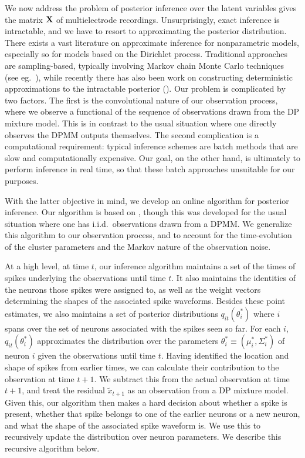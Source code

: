 \newcommand{\tx}{\tilde{x}}

We now address the problem of posterior inference over the latent variables gives the matrix $\mathbf{X}$ of multielectrode recordings. Unsurprisingly, exact 
inference is intractable, and we have to resort to approximating the posterior distribution.
There exists a vast literature on approximate inference for nonparametric models, especially so for models based on the Dirichlet process.
Traditional approaches are sampling-based, typically involving Markov chain Monte Carlo techniques (see eg.\ \citep{Nea2000, IshJam2001}), 
while recently there has also been work on constructing deterministic approximations to the intractable posterior (\citep{BleJor2006, MinGha2003}).
Our problem is complicated by two factors. The first is the convolutional nature of our observation process, where we observe a functional of the 
sequence of observations drawn from the DP mixture model. This is in contrast to the usual situation where one directly observes the DPMM outputs themselves.
The second complication is a computational requirement: typical inference schemes are batch methods that are slow and computationally expensive. 
Our goal, on the other hand, is ultimately to perform inference in real time, so that these batch approaches unsuitable for our purposes.

With the latter objective in mind, we develop an online algorithm for posterior inference. Our algorithm is based on \cite{WangDun2009}, though this was 
developed for the usual situation where one has i.i.d.\ observations drawn from a DPMM. We generalize this algorithm to our observation process, and to 
account for the time-evolution of the cluster parameters and the Markov nature of the observation noise.

At a high level, at time $t$, our inference algorithm maintains a set of the times of spikes underlying the observations until time $t$. It also maintains
the identities of the neurons those spikes were assigned to, as well as the weight vectors determining the shapes of the associated spike waveforms.
Besides these point estimates, we also maintains a set of posterior distributions $q_{it}(\theta^*_i)$ where $i$ spans over the
set of neurons associated with the spikes seen so far. For each $i$, $q_{it}(\theta^*_i)$ approximates the distribution over the parameters 
$\theta_i^* \equiv (\mu_i^*, \Sigma_i^*)$ of neuron $i$ given the observations until time $t$. 
Having identified the location and shape of spikes from earlier times, we can calculate their contribution to the observation at time $t+1$.
We subtract this from the actual observation at time $t+1$, and treat the residual $\tx_{t+1}$ as an observation from a DP mixture model.
Given this, our algorithm then makes a hard decision about whether a spike is present, whether that spike belongs to one of the earlier neurons
or a new neuron, and what the shape of the associated spike waveform is. We use this to recursively update the distribution over neuron parameters.
We describe this recursive algorithm below.



